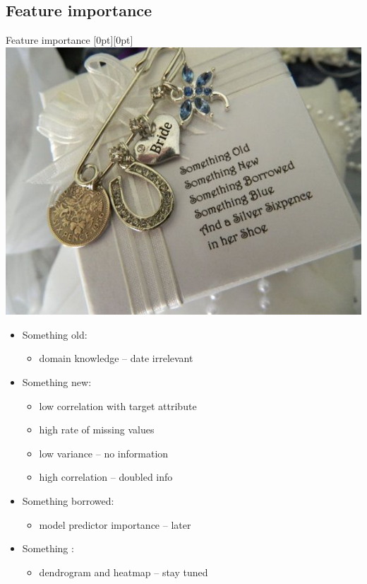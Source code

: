 \documentclass[hyperref={bookmarks=false}]{beamer}
\begin{document}
\subsection{Feature importance}
\begin{frame}{Feature importance}
\mbox{}\hfill\raisebox{-\height}[0pt][0pt]{\includegraphics[width=.42\linewidth]{something.jpg}}
\vspace*{-\baselineskip}

\begin{itemize}
    \item Something old:
    \begin{itemize}
        \item domain knowledge -- date irrelevant
    \end{itemize}
    
    \item Something new:
    \begin{itemize}
        \item low correlation with target attribute
        \item high rate of missing values
        \item low variance -- no information
        \item high correlation -- doubled info
    \end{itemize}
    
    \item Something borrowed:
    \begin{itemize}
        \item model predictor importance -- later
    \end{itemize}
    
    \item Something \color{teal}{blue}\color{black}:
    \begin{itemize}
        \item dendrogram and heatmap -- stay tuned
    \end{itemize}
\end{itemize}
\end{frame}
\end{document}
